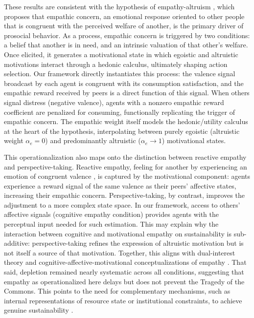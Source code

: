 These results are consistent with the hypothesis of empathy-altruism \cite{batson1997perspective,Batson01041991,batson2022empathy}, which proposes that empathic concern, an emotional response oriented to other people that is congruent with the perceived welfare of another, is the primary driver of prosocial behavior. As a process, empathic concern is triggered by two conditions: a belief that another is in need, and an intrinsic valuation of that other's welfare. Once elicited, it generates a motivational state in which egoistic and altruistic motivations interact through a hedonic calculus, ultimately shaping action selection. Our framework directly instantiates this process: the valence signal broadcast by each agent is congruent with its consumption satisfaction, and the empathic reward received by peers is a direct function of this signal. When others signal distress (negative valence), agents with a nonzero empathic reward coefficient are penalized for consuming, functionally replicating the trigger of empathic concern. The empathic weight itself models the hedonic/utility calculus at the heart of the hypothesis, interpolating between purely egoistic (altruistic weight $\alpha_e = 0$) and predominantly altruistic ($\alpha_e \rightarrow 1$) motivational states.

This operationalization also maps onto the distinction between reactive empathy and perspective-taking. Reactive empathy, feeling for another by experiencing an emotion of congruent valence \cite{batson1997perspective}, is captured by the motivational component: agents experience a reward signal of the same valence as their peers' affective states, increasing their empathic concern. Perspective-taking, by contrast, improves the adjustment to a more complex state space. In our framework, access to others' affective signals (cognitive empathy condition) provides agents with the perceptual input needed for such estimation. This may explain why the interaction between cognitive and motivational empathy on sustainability is sub-additive: perspective-taking refines the expression of altruistic motivation but is not itself a source of that motivation. Together, this aligns with dual-interest theory \cite{lynneTheoreticalFoundationEmpathy2016} and cognitive-affective-motivational conceptualizations of empathy \cite{decetyNeuralPathwaysDevelopment2015,dewaalMammalianEmpathyBehavioural2017}. That said, depletion remained nearly systematic across all conditions, suggesting that empathy as operationalized here delays but does not prevent the Tragedy of the Commons. This points to the need for complementary mechanisms, such as internal representations of resource state or institutional constraints, to achieve genuine sustainability \cite{ostromGeneralFrameworkAnalyzing2009,vanlangeHowWeCan2008}.


